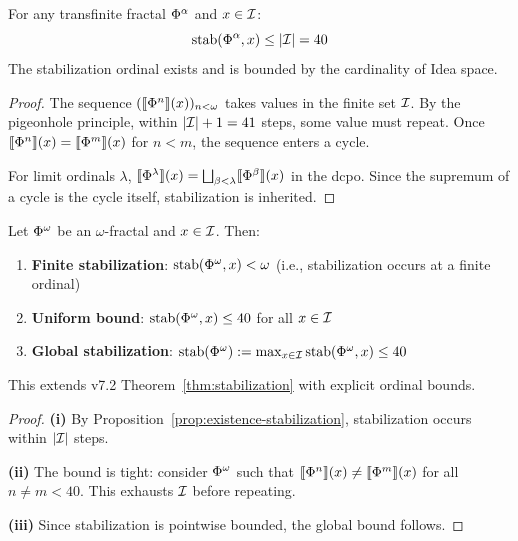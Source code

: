 \begin{proposition}
\label{prop:existence-stabilization}
For any transfinite fractal $\Phi^{\alpha}$ and $x \in \mathcal{I}$:
\[
\mathrm{stab}(\Phi^{\alpha}, x) \leq |\mathcal{I}| = 40
\]
The stabilization ordinal exists and is bounded by the cardinality of Idea space.
\end{proposition}

\begin{proof}
The sequence $(\llbracket \Phi^{n} \rrbracket(x))_{n < \omega}$ takes values in the finite set $\mathcal{I}$. By the pigeonhole principle, within $|\mathcal{I}| + 1 = 41$ steps, some value must repeat. Once $\llbracket \Phi^{n} \rrbracket(x) = \llbracket \Phi^{m} \rrbracket(x)$ for $n < m$, the sequence enters a cycle.

For limit ordinals $\lambda$, $\llbracket \Phi^{\lambda} \rrbracket(x) = \bigsqcup_{\beta < \lambda} \llbracket \Phi^{\beta} \rrbracket(x)$ in the dcpo. Since the supremum of a cycle is the cycle itself, stabilization is inherited.
\end{proof}

\begin{theorem}
\label{thm:transfinite-stabilization}
Let $\Phi^{\omega}$ be an $\omega$-fractal and $x \in \mathcal{I}$. Then:
\begin{enumerate}[label=(\roman*)]
  \item \textbf{Finite stabilization}: $\mathrm{stab}(\Phi^{\omega}, x) < \omega$ (i.e., stabilization occurs at a finite ordinal)
  \item \textbf{Uniform bound}: $\mathrm{stab}(\Phi^{\omega}, x) \leq 40$ for all $x \in \mathcal{I}$
  \item \textbf{Global stabilization}: $\mathrm{stab}(\Phi^{\omega}) := \max_{x \in \mathcal{I}} \mathrm{stab}(\Phi^{\omega}, x) \leq 40$
\end{enumerate}
This extends v7.2 Theorem~\ref*{thm:stabilization} with explicit ordinal bounds.
\end{theorem}

\begin{proof}
\textbf{(i)} By Proposition~\ref{prop:existence-stabilization}, stabilization occurs within $|\mathcal{I}|$ steps.

\textbf{(ii)} The bound is tight: consider $\Phi^{\omega}$ such that $\llbracket \Phi^{n} \rrbracket(x) \neq \llbracket \Phi^{m} \rrbracket(x)$ for all $n \neq m < 40$. This exhausts $\mathcal{I}$ before repeating.

\textbf{(iii)} Since stabilization is pointwise bounded, the global bound follows.
\end{proof}

